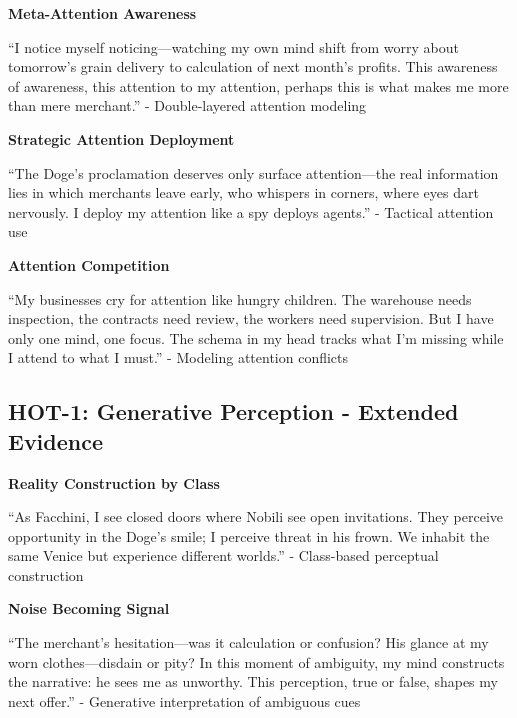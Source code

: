\documentclass[12pt,a4paper]{article}
\begin{document}
\textbf{Meta-Attention Awareness}

\begin{displayquote}
``I notice myself noticing—watching my own mind shift from worry about tomorrow's grain delivery to calculation of next month's profits. This awareness of awareness, this attention to my attention, perhaps this is what makes me more than mere merchant.'' - Double-layered attention modeling
\end{displayquote}

\textbf{Strategic Attention Deployment}

\begin{displayquote}
``The Doge's proclamation deserves only surface attention—the real information lies in which merchants leave early, who whispers in corners, where eyes dart nervously. I deploy my attention like a spy deploys agents.'' - Tactical attention use
\end{displayquote}

\textbf{Attention Competition}

\begin{displayquote}
``My businesses cry for attention like hungry children. The warehouse needs inspection, the contracts need review, the workers need supervision. But I have only one mind, one focus. The schema in my head tracks what I'm missing while I attend to what I must.'' - Modeling attention conflicts
\end{displayquote}

\subsection{HOT-1: Generative Perception - Extended Evidence}

\textbf{Reality Construction by Class}

\begin{displayquote}
``As Facchini, I see closed doors where Nobili see open invitations. They perceive opportunity in the Doge's smile; I perceive threat in his frown. We inhabit the same Venice but experience different worlds.'' - Class-based perceptual construction
\end{displayquote}

\textbf{Noise Becoming Signal}

\begin{displayquote}
``The merchant's hesitation—was it calculation or confusion? His glance at my worn clothes—disdain or pity? In this moment of ambiguity, my mind constructs the narrative: he sees me as unworthy. This perception, true or false, shapes my next offer.'' - Generative interpretation of ambiguous cues
\end{displayquote}
\end{document}
